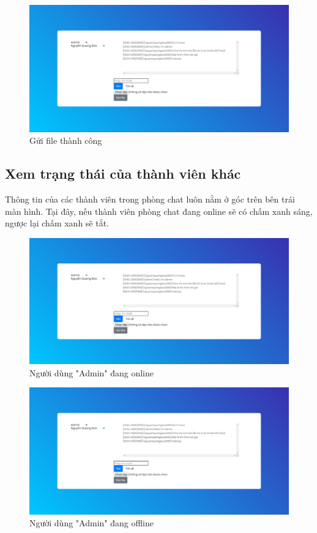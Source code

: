 \documentclass[a4paper]{article}
\begin{document}
	\begin{figure}[H]
		\centering
		\includegraphics[scale=0.36]{send_file_success.png}
		\caption{Gửi file thành công}
		\label{F:send_file_success}
	\end{figure}
	
	\subsection{Xem trạng thái của thành viên khác}
	Thông tin của các thành viên trong phòng chat luôn nằm ở góc trên bên trái màn hình. Tại đây, nếu thành viên phòng chat đang online sẽ có chấm xanh sáng, ngược lại chấm xanh sẽ tắt.
	
	\begin{figure}[H]
		\centering
		\includegraphics[scale=0.36]{user_status_online.png}
		\caption{Người dùng "Admin" đang online}
		\label{F:user_status_online}
	\end{figure}
	
	\begin{figure}[H]
		\centering
		\includegraphics[scale=0.36]{user_status_offline.png}
		\caption{Người dùng "Admin" đang offline}
		\label{F:user_status_offline}
	\end{figure}
	
\end{document}
